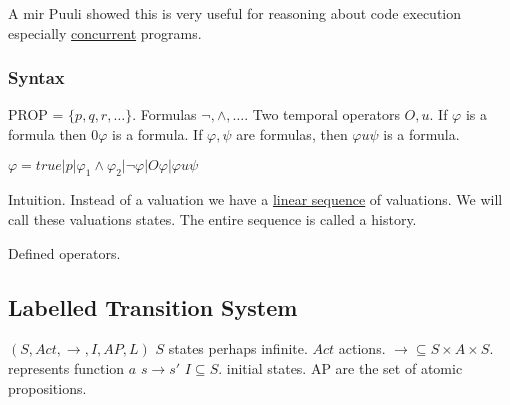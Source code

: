 \documentclass[../598comp.tex]{subfiles}
\begin{document}
A mir Puuli showed this is very useful for reasoning about code execution
especially \ul{concurrent} programs.

\subsubsection{Syntax}
PROP = $\{p, q, r, \dots\}$. Formulas $\neg, \wedge, \dots$. Two temporal
operators $O, u$. If $\varphi$ is a formula then $0\varphi$ is a formula. If
$\varphi, \psi$ are formulas, then $\varphi u \psi $ is a formula.

$\varphi = true |p| \varphi_1 \wedge \varphi_2 |\neg \varphi| O\varphi |\varphi
u \psi$

Intuition. Instead of a valuation we have a \ul{linear sequence} of valuations.
We will call these valuations states. The entire sequence is called a history.

Defined operators.
\subsection{Labelled Transition System}

$(S, Act, \to, I, AP, L)$
$S$ states perhaps infinite. $Act$ actions. $\to \subseteq S \times A \times S$.
represents function $a$ $s \to s'$
$I \subseteq S$. initial states. AP are the set of atomic propositions.
\end{document}
